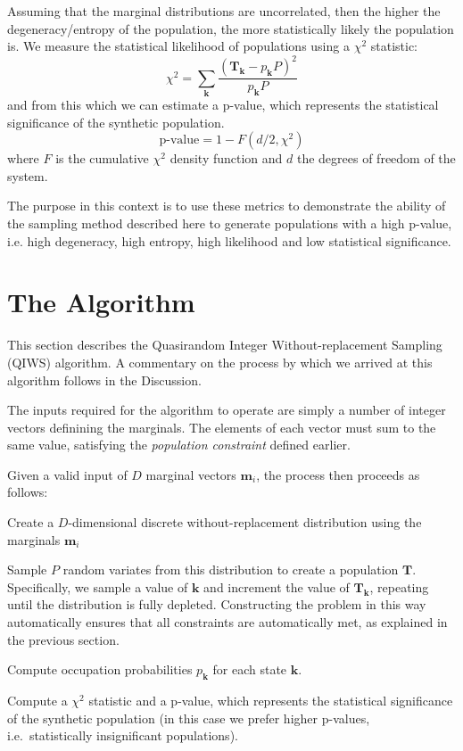\documentclass{JASSS}
\begin{document}
Assuming that the marginal distributions are uncorrelated, then the
higher the degeneracy/entropy of the population, the more statistically likely
the population is. We measure the statistical likelihood of populations using a \(\chi^2\) statistic:
\begin{equation}
\chi^2 = \sum\limits_{\mathbf{k}}\frac{(\mathbf{T}_\mathbf{k}-p_\mathbf{k}P)^2}{p_\mathbf{k}P}
\label{eqn:chi2}
\end{equation}
and from this which we can estimate a p-value, which represents the statistical
significance of the synthetic population.
\begin{equation}
\text{p-value}=1-F(d/2,\chi^2) 
\end{equation}
where \(F\) is the cumulative
\(\chi^2\) density function and \(d\) the degrees of freedom of the
system. 

The purpose in this context is to use these metrics to demonstrate the ability of the sampling method described here to generate populations with a high p-value, i.e. high degeneracy, high entropy, high likelihood and low statistical significance.

\section{The Algorithm}\label{the-algorithm}

This section describes the Quasirandom Integer Without-replacement Sampling (QIWS) algorithm. A commentary on the process by which we arrived at this algorithm follows in the Discussion.

The inputs required for the algorithm to operate are simply a number of integer vectors definining the marginals. The elements of each vector must sum to the same value, satisfying the \emph{population constraint} defined earlier.

Given a valid input of \(D\) marginal vectors \(\mathbf{m}_i\), the process then proceeds as follows:

\begin{enumerate*}
\item
  Create a \(D\)-dimensional discrete without-replacement distribution
  using the marginals \(\mathbf{m}_i\)
\item
  Sample \(P\) random variates from this distribution to create a
  population \(\mathbf{T}\). Specifically, we sample a value of
  \(\mathbf{k}\) and increment the value of \(\mathbf{T}_\mathbf{k}\),
  repeating until the distribution is fully depleted. Constructing the
  problem in this way automatically ensures that all constraints are
  automatically met, as explained in the previous section.
\item
  Compute occupation probabilities \(p_\mathbf{k}\) for each state
  \(\mathbf{k}\).
\item
  Compute a \(\chi^2\) statistic and a p-value, which represents the
  statistical significance of the synthetic population (in this case we
  prefer higher p-values, i.e.~statistically insignificant populations).
\end{enumerate*}
\end{document}
